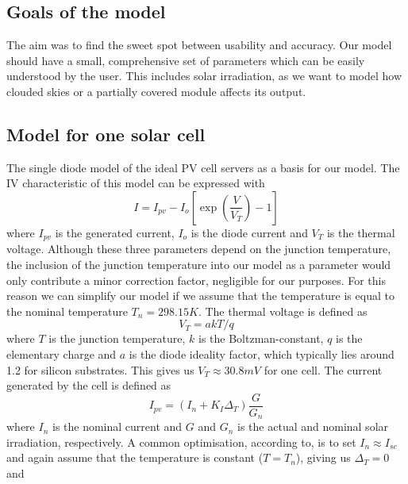 \subsection{Goals of the model}

The aim  was  to  find  the sweet spot between usability and accuracy. Our model
should  have  a  small,  comprehensive  set  of parameters which can  be  easily
understood by the user. This includes solar irradiation, as we want to model how
clouded skies or a partially covered module affects its output.


\subsection{Model for one solar cell}

The single diode model of the ideal PV cell\cite{ref:villa:pvmodel} servers as a
basis for our model.  The  IV characteristic of this model can be expressed with
\begin{equation} \label{eq:IV_old}
    I = I_{pv} - I_o \left[ \exp \left( \frac{V}{V_T} \right) - 1 \right]
\end{equation}
where $I_{pv}$ is the generated current, $I_o$ is the diode current and $V_T$ is
the thermal  voltage.  Although  these  three  parameters depend on the junction
temperature,  the  inclusion  of  the junction temperature into our model  as  a
parameter would only contribute a minor correction factor,  negligible  for  our
purposes.  For  this  reason  we  can simplify our model if we assume  that  the
temperature is equal to  the  nominal  temperature  $T_n = 298.15K$. The thermal
voltage is defined as
\begin{equation}
    V_T = a k T / q
\end{equation}
where  $T$ is the junction temperature, $k$ is the Boltzman-constant, $q$ is the
elementary  charge  and  $a$  is the diode ideality factor, which typically lies
around 1.2 for silicon substrates. This gives us $V_T \approx  30.8mV$  for  one
cell. The current generated by the cell is defined as
\begin{equation}
    I_{pv} = \left( I_n + K_I \Delta_T \right) \frac{G}{G_n}
\end{equation}
where $I_n$ is the  nominal  current and $G$ and $G_n$ is the actual and nominal
solar   irradiation,   respectively.    A    common    optimisation,   according
to\cite{ref:villa:pvmodel}, is to set $I_n \approx I_{sc}$ and again assume that
the  temperature  is  constant  ($T  =  T_n$), giving  us  $\Delta_T  =  0$  and
